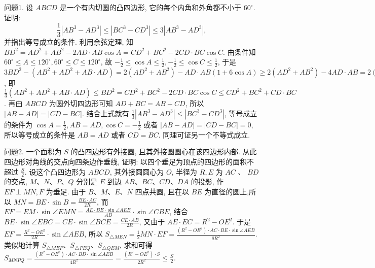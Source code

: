 
问题1. 设 $A B C D$ 是一个有内切圆的凸四边形, 它的每个内角和外角都不小于 $60^{\circ}$. 证明:
$$
\frac{1}{3}\left|A B^3-A D^3\right| \leqslant\left|B C^3-C D^3\right| \leqslant 3\left|A B^3-A D^3\right|,
$$
并指出等号成立的条件.
利用余弦定理, 知 $B D^2=A D^2+A B^2-2 A D \cdot A B \cos A=C D^2+ B C^2-2 C D \cdot B C \cos C$. 由条件知 $60^{\circ} \leqslant A \leqslant 120^{\circ}, 60^{\circ} \leqslant C \leqslant 120^{\circ}$, 故 $-\frac{1}{2} \leqslant \cos A \leqslant \frac{1}{2},-\frac{1}{2} \leqslant \cos C \leqslant \frac{1}{2}$, 于是 $3 B D^2-\left(A B^2+A D^2+A B \cdot A D\right)= 2\left(A D^2+A B^2\right)-A D \cdot A B(1+6 \cos A) \geqslant 2\left(A D^2+A B^2\right)-4 A D \cdot A B= 2(A B-A D)^2 \geqslant 0$, 即 $\frac{1}{3}\left(A B^2+A D^2+A B \cdot A D\right) \leqslant B D^2=C D^2+B C^2- 2 C D \cdot B C \cos C \leqslant C D^2+B C^2+C D \cdot B C$. 再由 $A B C D$ 为圆外切四边形可知 $A D+B C=A B+C D$, 所以 $|A B-A D|=|C D-B C|$. 结合上式就有 $\frac{1}{3}\left|A B^3-A D^3\right| \leqslant\left|B C^3-C D^3\right|$, 等号成立的条件为 $\cos A=\frac{1}{2}, A B= A D, \cos C=-\frac{1}{2}$ 或者 $|A B-A D|=|C D-B C|=0$, 所以等号成立的条件是 $A B=A D$ 或者 $C D=B C$. 同理可证另一个不等式成立.



问题2. 一个面积为 $S$ 的凸四边形有外接圆, 且其外接圆圆心在该四边形内部.
从此四边形对角线的交点向四条边作垂线, 证明: 以四个垂足为顶点的四边形的面积不超过 $\frac{S}{2}$.
设这个凸四边形为 $A B C D$, 其外接圆圆心为 $O$, 半径为 $R, E$ 为 $A C$ 、 $B D$ 的交点, $M 、 N 、 P 、 Q$ 分别是 $E$ 到边 $A B 、 B C 、 C D 、 D A$ 的投影, 作 $E F \perp M N, F$ 为垂足.
由于 $B 、 M 、 E 、 N$ 四点共圆, 且在以 $B E$ 为直径的圆上,所以 $M N=B E \cdot \sin B=\frac{B E \cdot A C}{2 R}$, 而 $E F=E M \cdot \sin \angle E M N= \frac{A E \cdot B E \cdot \sin \angle A E B}{A B} \cdot \sin \angle C B E$, 结合 $B E \cdot \sin \angle E B C=C E \cdot \sin \angle B C E= \frac{C E \cdot A B}{2 R}$, 又由于 $A E \cdot E C=R^2-O E^2$. 于是 $E F=\frac{R^2-O E^2}{2 R} \cdot \sin \angle A E B$, 所以 $S_{\triangle M E N}=\frac{1}{2} M N \cdot E F=\frac{\left(R^2-O E^2\right) \cdot A C \cdot B E \cdot \sin \angle A E B}{8 R^2}$. 类似地计算 $S_{\triangle M E P} 、 S_{\triangle P E Q} 、 S_{\triangle Q E M}$, 求和可得 $S_{M N P Q}=\frac{\left(R^2-O E^2\right) \cdot A C \cdot B D \cdot \sin \angle A E B}{4 R^2}= \frac{\left(R^2-O E^2\right) \cdot S}{2 R^2} \leqslant \frac{S}{2}$.



